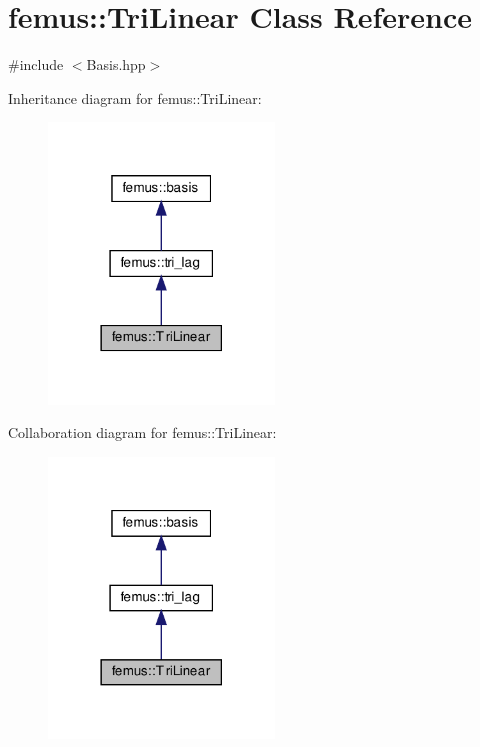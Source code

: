 \hypertarget{classfemus_1_1_tri_linear}{}\section{femus\+:\+:Tri\+Linear Class Reference}
\label{classfemus_1_1_tri_linear}


{\ttfamily \#include $<$Basis.\+hpp$>$}



Inheritance diagram for femus\+:\+:Tri\+Linear\+:
\nopagebreak
\begin{figure}[H]
\begin{center}
\leavevmode
\includegraphics[width=170pt]{classfemus_1_1_tri_linear__inherit__graph}
\end{center}
\end{figure}


Collaboration diagram for femus\+:\+:Tri\+Linear\+:
\nopagebreak
\begin{figure}[H]
\begin{center}
\leavevmode
\includegraphics[width=170pt]{classfemus_1_1_tri_linear__coll__graph}
\end{center}
\end{figure}
